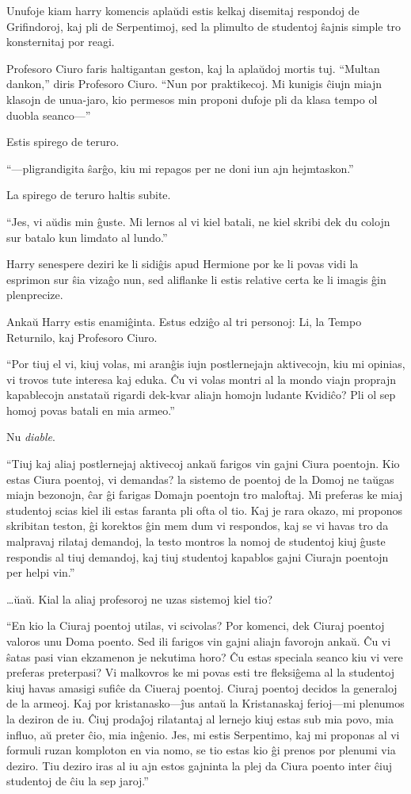 Unufoje kiam harry komencis aplaŭdi estis kelkaj disemitaj respondoj
de Grifindoroj, kaj pli de Serpentimoj, sed la plimulto de studentoj
ŝajnis simple tro konsternitaj por reagi.

Profesoro Ciuro faris haltigantan geston, kaj la aplaŭdoj mortis
tuj. ``Multan dankon,'' diris Profesoro Ciuro. ``Nun por
praktikecoj. Mi kunigis ĉiujn miajn klasojn de unua-jaro, kio permesos
min proponi dufoje pli da klasa tempo ol duobla seanco—''

Estis spirego de teruro.

``—pligrandigita ŝarĝo, kiu mi repagos per ne doni iun ajn hejmtaskon.''

La spirego de teruro haltis subite.

``Jes, vi aŭdis min ĝuste. Mi lernos al vi kiel batali, ne kiel skribi
dek du colojn sur batalo kun limdato al lundo.''

Harry senespere deziri ke li sidiĝis apud Hermione por ke li povas
vidi la esprimon sur ŝia vizaĝo nun, sed aliflanke li estis relative
certa ke li imagis ĝin plenprecize.

Ankaŭ Harry estis enamiĝinta. Estus edziĝo al tri personoj: Li, la
Tempo Returnilo, kaj Profesoro Ciuro.

``Por tiuj el vi, kiuj volas, mi aranĝis iujn postlernejajn
aktivecojn, kiu mi opinias, vi trovos tute interesa kaj eduka. Ĉu vi
volas montri al la mondo viajn proprajn kapablecojn anstataŭ rigardi
dek-kvar aliajn homojn ludante Kvidiĉo? Pli ol sep homoj povas batali
en mia armeo.''

Nu \emph{diable}.

``Tiuj kaj aliaj postlernejaj aktivecoj ankaŭ farigos vin gajni Ciura
poentojn. Kio estas Ciura poentoj, vi demandas? la sistemo de poentoj
de la Domoj ne taŭgas miajn bezonojn, ĉar ĝi farigas Domajn poentojn
tro maloftaj. Mi preferas ke miaj studentoj scias kiel ili estas
faranta pli ofta ol tio. Kaj je rara okazo, mi proponos skribitan
teston, ĝi korektos ĝin mem dum vi respondos, kaj se vi havas tro da
malpravaj rilataj demandoj, la testo montros la nomoj de studentoj
kiuj ĝuste respondis al tiuj demandoj, kaj tiuj studentoj kapablos
gajni Ciurajn poentojn per helpi vin.''

\ldots ŭaŭ. Kial la aliaj profesoroj ne uzas sistemoj kiel tio?

``En kio la Ciuraj poentoj utilas, vi scivolas? Por komenci, dek
Ciuraj poentoj valoros unu Doma poento. Sed ili farigos vin gajni
aliajn favorojn ankaŭ. Ĉu vi ŝatas pasi vian ekzamenon je nekutima
horo? Ĉu estas speciala seanco kiu vi vere preferas preterpasi? Vi
malkovros ke mi povas esti tre fleksiĝema al la studentoj kiuj havas
amasigi sufiĉe da Ciueraj poentoj. Ciuraj poentoj decidos la generaloj
de la armeoj. Kaj por kristanasko—ĵus antaŭ la Kristanaskaj ferioj—mi
plenumos la deziron de iu. Ĉiuj prodaĵoj rilatantaj al lernejo kiuj
estas sub mia povo, mia influo, aŭ preter ĉio, mia inĝenio. Jes, mi
estis Serpentimo, kaj mi proponas al vi formuli ruzan komploton en via
nomo, se tio estas kio ĝi prenos por plenumi via deziro. Tiu deziro
iras al iu ajn estos gajninta la plej da Ciura poento inter ĉiuj
studentoj de ĉiu la sep jaroj.''

